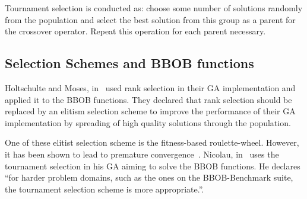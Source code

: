 Tournament selection is conducted as: choose some number of solutions randomly from the population and select the best solution from this group as a parent for the crossover operator. Repeat this operation for each parent necessary.
%
%
%	
%	
%		
%
%
%


\subsection{Selection Schemes and BBOB functions}


Holtschulte and Moses, in~\cite{holtschulte2013benchmarking} used rank selection in their GA implementation and applied it to the BBOB functions. They declared that rank selection should be replaced by an elitism selection scheme to improve the performance of their GA implementation by spreading of high quality solutions through the population. 

One of these elitist selection scheme is the fitness-based roulette-wheel. However, it has been shown to lead to premature convergence~\cite{baker1987reducing}. Nicolau, in~\cite{nicolau2009application} uses the tournament selection in his GA aiming to solve the BBOB functions. He declares ``for harder problem domains, such as the ones on the BBOB-Benchmark suite, the tournament selection scheme is more appropriate.''.

